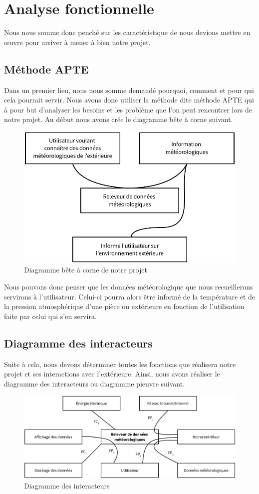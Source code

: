 \section{Analyse fonctionnelle}

Nous nous somme donc penché sur les caractéristique de nous devions mettre en œuvre pour arriver à mener à bien notre projet.

\subsection{Méthode APTE}

Dans un premier lieu, nous nous somme demandé pourquoi, comment et pour qui cela pourrait servir. Nous avons donc utiliser la méthode dite \og méthode APTE \fg qui à pour but d'analyser les besoins et les problème que l'on peut rencontrer lors de notre projet. Au début nous avons crée le diagramme bête à corne suivant.

\begin{figure}[!h]
	\centering
	\includegraphics[width=.6\linewidth]{Images/Diagramme_APTE}
	\caption{Diagramme bête à corne de notre projet}
\end{figure}

Nous pouvons donc penser que les données météorologique que nous recueillerons servirons à l'utilisateur. Celui-ci pourra alors être informé de la température et de la pression atmosphérique d'une pièce ou extérieure en fonction de l'utilisation faite par celui qui s'en servira.

\subsection{Diagramme des interacteurs}

Suite à cela, nous devons déterminer toutes les fonctions que réalisera notre projet et ses interactions avec l'extérieure. Ainsi, nous avons réaliser le diagramme des interacteurs ou diagramme \og pieuvre \fg suivant.

\begin{figure}[!h]
	\centering
	\includegraphics[width=\linewidth]{Images/Diagramme_pieuvre}
	\caption{Diagramme des interacteurs}
\end{figure}


